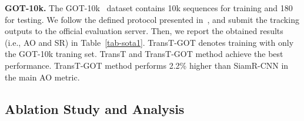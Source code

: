 \documentclass[final]{cvpr}
\begin{document}
{\noindent \textbf{GOT-10k. }} The GOT-10k~\cite{GOT10K} dataset contains 10k sequences for training and 180 for testing. 
We follow the defined protocol presented in~\cite{GOT10K}, and submit the tracking outputs to the official evaluation 
server.
Then, we report the obtained results (i.e., AO and SR) in Table~\ref{tab-sota1}. TransT-GOT denotes training with only the GOT-10k traning set.
TransT and TransT-GOT method achieve the best performance. TransT-GOT method performs 2.2\% higher than SiamR-CNN in the main AO metric.

\subsection{Ablation Study and Analysis}
\label{subsec-as}

\begin{table}[!t]
\caption{Ablation study on TrackingNet, LaSOT, and GOT-10k. The best results 
are shown in the \textbf{\textcolor{red}{red}} font.}
\vspace{-6mm}
\label{tab-ab}
\begin{center}
\end{center}
\vspace{-7mm}
\end{table}
\end{document}
